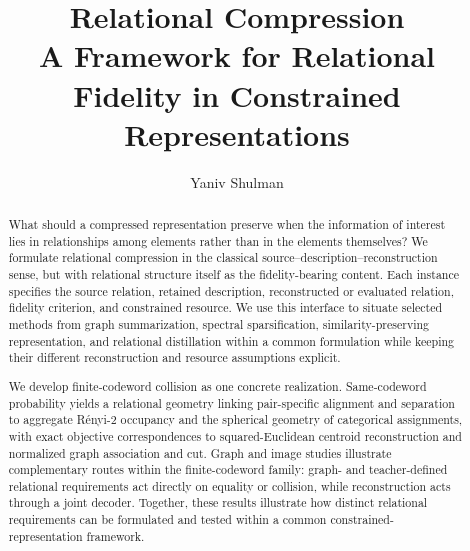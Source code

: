 \documentclass[final,nopreprintline,1p,times,authoryear]{elsarticle}
\title{Relational Compression\\[0.35ex]
{\large\normalfont A Framework for Relational Fidelity in Constrained Representations}}
\begin{document}
\begin{frontmatter}
\author{Yaniv Shulman}
\begin{abstract}
What should a compressed representation preserve when the information of interest lies in relationships among elements rather than in the elements themselves?
We formulate relational compression in the classical source--description--reconstruction sense, but with relational structure itself as the fidelity-bearing content.
Each instance specifies the source relation, retained description, reconstructed or evaluated relation, fidelity criterion, and constrained resource.
We use this interface to situate selected methods from graph summarization, spectral sparsification, similarity-preserving representation, and relational distillation within a common formulation while keeping their different reconstruction and resource assumptions explicit.

We develop finite-codeword collision as one concrete realization.
Same-codeword probability yields a relational geometry linking pair-specific alignment and separation to aggregate R\'enyi-2 occupancy and the spherical geometry of categorical assignments, with exact objective correspondences to squared-Euclidean centroid reconstruction and normalized graph association and cut.
Graph and image studies illustrate complementary routes within the finite-codeword family: graph- and teacher-defined relational requirements act directly on equality or collision, while reconstruction acts through a joint decoder.
Together, these results illustrate how distinct relational requirements can be formulated and tested within a common constrained-representation framework.
\end{abstract}
\end{frontmatter}






\clearpage


\clearpage
\appendix

\end{document}
